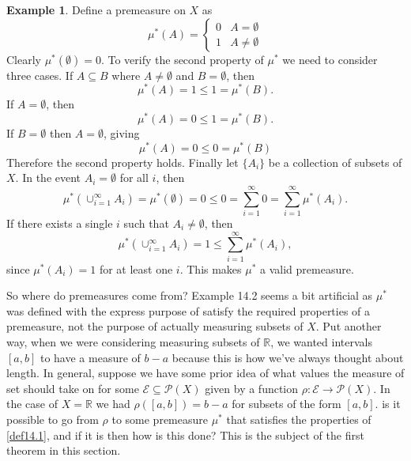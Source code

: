 \documentclass{article}
\newcommand{\R}{\mathbb{R}}
\theoremstyle{definition}
\newtheorem{example}{Example}[section]
\begin{document}
\begin{example}
	Define a premeasure on $X$ as
	$$ \mu^*(A) = \begin{cases}
		0 & A=\emptyset\\
		1 & A\neq\emptyset
	\end{cases}$$
Clearly $\mu^*(\emptyset)= 0$. To verify the second property of $\mu^*$ we need to consider three cases. If $A\subseteq B$ where $A \neq \emptyset$ and $B=\emptyset$, then 
$$\mu^*(A) = 1 \le 1 = \mu^*(B).$$ If $A = \emptyset$, then 
$$ \mu^*(A) = 0 \le 1 = \mu^*(B) .$$ If $B=\emptyset$ then $A=\emptyset$, giving 
$$ \mu^*(A) = 0 \le 0 = \mu^*(B) $$
Therefore the second property holds. Finally let $\{A_i\}$ be a collection of subsets of $X$. In the event $A_i = \emptyset$ for all $i$, then 
$$ \mu^*(\cup_{i=1}^\infty A_i) = \mu^*(\emptyset) = 0 \le 0 =  \sum_{i=1}^{\infty}0= \sum_{i=1}^{\infty}\mu^*(A_i).$$ If there exists a single $i$ such that $A_i\neq \emptyset$, then 
$$  \mu^*(\cup_{i=1}^\infty A_i) = 1 \le \sum_{i=1}^{\infty}\mu^*(A_i) ,$$ since $\mu^*(A_i) = 1$ for at least one $i$. This makes $\mu^*$ a valid premeasure.
\end{example}

So where do premeasures come from? Example 14.2 seems a bit artificial as $\mu^*$ was defined with the express purpose of satisfy the required properties of a premeasure, not the purpose of actually measuring subsets of $X$. Put another way, when we were considering measuring subsets of $\R$, we wanted intervals $[a,b]$ to have a measure of $b-a$ because this is how we've always thought about length. In general, suppose we have some prior idea of what values the measure of set should take on for some $\mathcal E\subseteq \mathcal P(X)$ given by a function $\rho:\mathcal E\to \mathcal P(X)$. In the case of $X=\R$ we had $\rho([a,b])=b-a$ for subsets of the form $[a,b]$. is it possible to go from $\rho$ to some premeasure $\mu^*$ that satisfies the properties of \cref{def14.1}, and if it is then how is this done? This is the subject of the first theorem in this section.
\end{document}
